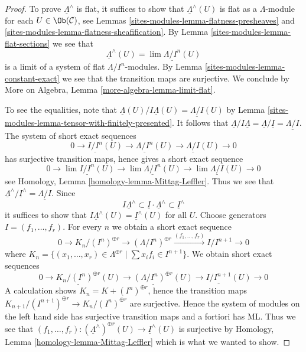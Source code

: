 \begin{proof}
To prove $\underline{\Lambda}^\wedge$ is flat, it suffices to show that
$\underline{\Lambda}^\wedge(U)$ is flat as a $\Lambda$-module for each
$U \in \Ob(\mathcal{C})$, see
Lemmas \ref{sites-modules-lemma-flatness-presheaves} and
\ref{sites-modules-lemma-flatness-sheafification}.
By Lemma \ref{sites-modules-lemma-flat-sections} we see that
$$
\underline{\Lambda}^\wedge(U) = \lim \underline{\Lambda/I^n}(U)
$$
is a limit of a system of flat $\Lambda/I^n$-modules.
By Lemma \ref{sites-modules-lemma-constant-exact} we see that the transition maps
are surjective. We conclude by
More on Algebra, Lemma \ref{more-algebra-lemma-limit-flat}.

\medskip\noindent
To see the equalities, note that
$\underline{\Lambda}(U)/I\underline{\Lambda}(U) = \underline{\Lambda/I}(U)$
by Lemma \ref{sites-modules-lemma-tensor-with-finitely-presented}.
It follows that $\underline{\Lambda}/I\underline{\Lambda} =
\underline{\Lambda}/\underline{I} = \underline{\Lambda/I}$. The system
of short exact sequences
$$
0 \to \underline{I/I^n}(U) \to \underline{\Lambda/I^n}(U) \to
\underline{\Lambda/I}(U) \to 0
$$
has surjective transition maps, hence gives a short exact sequence
$$
0 \to \lim \underline{I/I^n}(U) \to \lim \underline{\Lambda/I^n}(U) \to
\lim \underline{\Lambda/I}(U) \to 0
$$
see Homology, Lemma \ref{homology-lemma-Mittag-Leffler}. Thus we see that
$\underline{\Lambda}^\wedge/\underline{I}^\wedge =
\underline{\Lambda/I}$. Since
$$
I \underline{\Lambda}^\wedge \subset
\underline{I} \cdot \underline{\Lambda}^\wedge \subset
\underline{I}^\wedge
$$
it suffices to show that
$I \underline{\Lambda}^\wedge(U) = \underline{I}^\wedge(U)$
for all $U$. Choose generators $I = (f_1, \ldots, f_r)$.
For every $n$ we obtain a short exact sequence
$$
0 \to K_n/(I^n)^{\oplus r} \to (\Lambda/I^n)^{\oplus r}
\xrightarrow{(f_1, \ldots, f_r)}
I/I^{n + 1} \to 0
$$
where $K_n =
\{(x_1, \ldots, x_r) \in \Lambda^{\oplus r} \mid \sum x_i f_i \in I^{n + 1}\}$.
We obtain short exact sequences
$$
0 \to \underline{K_n/(I^n)^{\oplus r}}(U) \to
\underline{(\Lambda/I^n)^{\oplus r}}(U) \to
\underline{I/I^{n + 1}}(U) \to 0
$$
A calculation shows $K_n = K + (I^n)^{\oplus r}$, hence
the transition maps
$K_{n + 1}/(I^{n + 1})^{\oplus r} \to K_n/(I^n)^{\oplus r}$ are surjective.
Hence the system of modules on the left hand side has surjective transition
maps and a fortiori has ML. Thus we see that
$(f_1, \ldots, f_r) :
(\underline{\Lambda}^\wedge)^{\oplus r}(U) \to \underline{I}^\wedge(U)$
is surjective by
Homology, Lemma \ref{homology-lemma-Mittag-Leffler}
which is what we wanted to show.
\end{proof}

